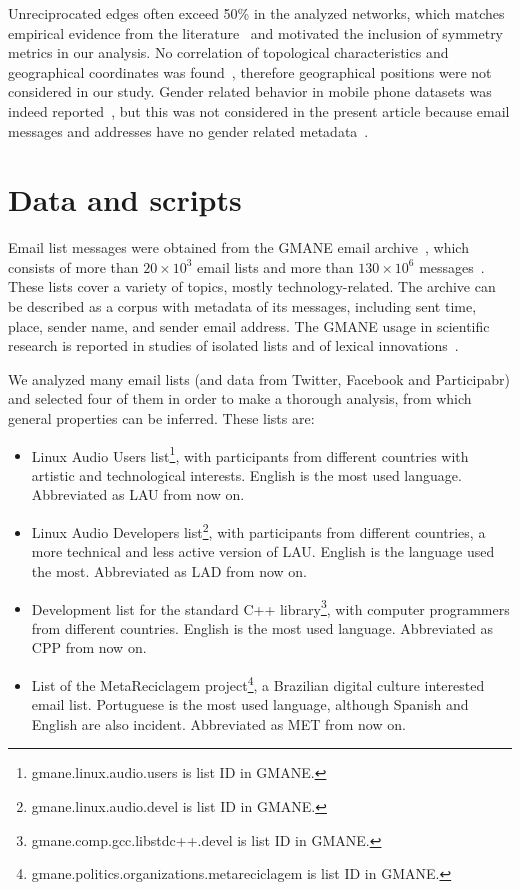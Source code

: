 \documentclass[%
	aip,
	jmp,%
	amsmath,amssymb,
	reprint,%
]{revtex4-1}
\begin{document}
Unreciprocated edges often exceed 50\% in the analyzed networks, which matches empirical evidence from the literature~\cite{newmanEvolving} and motivated the inclusion of symmetry metrics in our analysis. No correlation of topological characteristics and geographical coordinates was found~\cite{barabasiGeo}, therefore geographical positions were not considered in our study. Gender related behavior in mobile phone datasets was indeed reported~\cite{barabasiSex}, but this was not considered in the present article because email messages and addresses have no gender related metadata~\cite{gmanePack}.


\section{Data and scripts}\label{sec:data}\label{scripts}

Email list messages were obtained from
the GMANE email archive~\cite{gmanePack}, which consists of more than $20\times 10^3$
email lists and more than $130\times 10^6$ messages~\cite{GMANEwikipedia}. These lists cover a variety of topics, mostly technology-related. The archive can be described as a corpus with metadata of its messages, including sent time, place, sender name, and sender email address.
The GMANE usage in scientific research is reported in studies of isolated lists and of lexical innovations~\cite{GMANE2,bird}. 

We analyzed many email lists (and data from Twitter, Facebook and Participabr)
and selected four of them in order to make a thorough analysis,
from which general properties can be inferred. These lists are:
\begin{itemize}
	\item Linux Audio Users list\footnote{gmane.linux.audio.users is list ID in GMANE.},
		with participants from different countries with artistic and technological interests.
		English is the most used language. Abbreviated as LAU from now on.
	\item Linux Audio Developers list\footnote{gmane.linux.audio.devel is list ID in GMANE.},
		with participants from different countries,
		a more technical and less active version of LAU.
		English is the language used the most. 
		Abbreviated as LAD from now on.
	\item Development list for the standard C++ library\footnote{gmane.comp.gcc.libstdc++.devel is list ID in GMANE.},
		with computer programmers from different countries.
		English is the most used language.
		Abbreviated as CPP from now on.
	\item List of the MetaReciclagem project\footnote{gmane.politics.organizations.metareciclagem is list ID in GMANE.},
		a Brazilian digital culture interested email list.
		Portuguese is the most used language,
		although Spanish and English are also incident.
		Abbreviated as MET from now on.
\end{itemize} 
\end{document}
